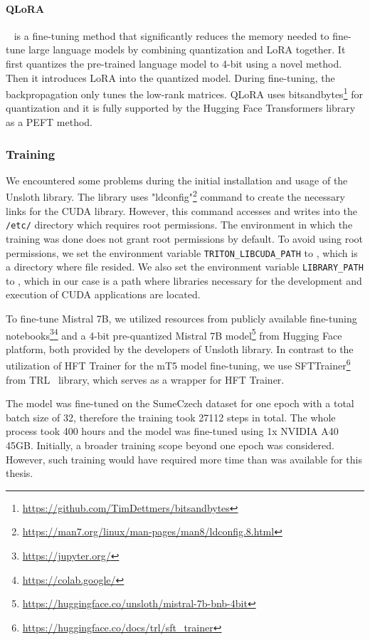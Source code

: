 \documentclass[english, ba, kiv, he, iso690numb, pdf, viewonly]{fasthesis}
\begin{document}
\paragraph{QLoRA}
~\cite{dettmers2023qlora} is a fine-tuning method that significantly reduces the memory needed to fine-tune large language models by combining quantization and LoRA together. It first quantizes the pre-trained language model to 4-bit using a novel method. Then it introduces LoRA into the quantized model. During fine-tuning, the backpropagation only tunes the low-rank matrices. QLoRA uses bitsandbytes\footnote{\url{https://github.com/TimDettmers/bitsandbytes}} for quantization and it is fully supported by the Hugging Face Transformers library as a PEFT method.

\subsubsection{Training}
We encountered some problems during the initial installation and usage of the Unsloth library. The library uses \command"ldconfig"\footnote{\url{https://man7.org/linux/man-pages/man8/ldconfig.8.html}} command to create the necessary links for the CUDA library. However, this command accesses and writes into the \texttt{/etc/} directory which requires root permissions. The environment in which the training was done does not grant root permissions by default. To avoid using root permissions, we set the environment variable \texttt{TRITON\_LIBCUDA\_PATH} to , which is a directory where  file resided. We also set the environment variable \texttt{LIBRARY\_PATH} to , which in our case is a path where libraries necessary for the development and execution of CUDA applications are located.

To fine-tune Mistral 7B, we utilized resources from publicly available fine-tuning notebooks\footnote{\url{https://jupyter.org/}}\footnote{\url{https://colab.google/}} and a 4-bit pre-quantized Mistral 7B model\footnote{\url{https://huggingface.co/unsloth/mistral-7b-bnb-4bit}} from Hugging Face platform, both provided by the developers of Unsloth library. In contrast to the utilization of HFT Trainer for the mT5 model fine-tuning, we use SFTTrainer\footnote{\url{https://huggingface.co/docs/trl/sft_trainer}} from TRL~\cite{vonwerra2022trl} library, which serves as a wrapper for HFT Trainer.

The model was fine-tuned on the SumeCzech dataset for one epoch with a total batch size of 32, therefore the training took 27112 steps in total. The whole process took 400 hours and the model was fine-tuned using 1x NVIDIA A40 45GB. Initially, a broader training scope beyond one epoch was considered. However, such training would have required more time than was available for this thesis.
\end{document}
